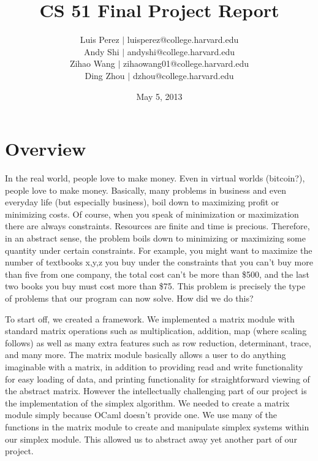\documentclass[letterpaper,11pt]{article}
\begin{document}
\title{CS 51 Final Project Report}
\author{
Luis Perez $|$ luisperez@college.harvard.edu \\ 
Andy Shi $|$ andyshi@college.harvard.edu \\ 
Zihao Wang $|$ zihaowang01@college.harvard.edu \\ 
Ding Zhou $|$ dzhou@college.harvard.edu
}
\date{May 5, 2013}
\maketitle

\section{Overview}

In the real world, people love to make money. Even in virtual worlds (bitcoin?),
people love to make money. Basically, many problems in business and even
everyday life (but especially business), boil down to maximizing profit or
minimizing costs. Of course, when you speak of minimization or maximization
there are always constraints. Resources are finite and time is precious.
Therefore, in an abstract sense, the problem boils down to minimizing or
maximizing some quantity under certain constraints. For example, you might want
to maximize the number of textbooks x,y,z you buy under the constraints that you
can't buy more than five from one company, the total cost can't be more
than \$500, and the last two books you buy must cost more than \$75. This problem
is precisely the type of problems that our program can now solve. How did we do
this?

To start off, we created a framework. We implemented a matrix module with
standard matrix operations such as multiplication, addition, map (where scaling
follows) as well as many extra features such as row reduction, determinant,
trace, and many more. The matrix module basically allows a user to do anything
imaginable with a matrix, in addition to providing read and write functionality
for easy loading of data, and printing functionality for straightforward viewing
of the abstract matrix. However the intellectually challenging part of our
project is the implementation of the simplex algorithm. We needed to create a
matrix module simply because OCaml doesn't provide one. We use many of the
functions in the matrix module to create and manipulate simplex systems within
our simplex module. This allowed us to abstract away yet another part of our
project.
\end{document}
